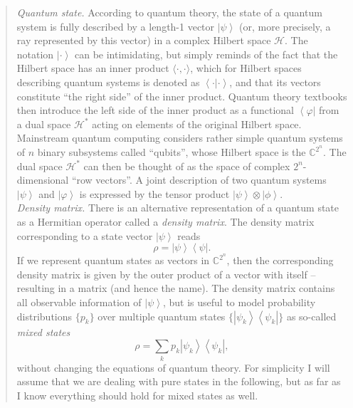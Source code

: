 \documentclass[aps, reprint, onecolumn, nofootinbib, longbibliography]{revtex4-2}
\newcommand{\ket}[1]{\ensuremath{\left| #1 \right \rangle}}
\newcommand{\bra}[1]{\ensuremath{\left \langle #1 \right |}}
\newcommand{\braket}[2]{\ensuremath{\left\langle #1\left|#2 \right.\right\rangle}}
\newcommand{\ketbra}[2]{\ket{#1}\!\bra{#2}}
\begin{document}
\begin{quote}
    \textit{Quantum state.} According to quantum theory, the state of a quantum system is fully described by a length-1 vector $\ket{\psi}$ (or, more precisely, a ray represented by this vector) in a complex Hilbert space $\mathcal{H}$. The notation $\ket{\cdot}$ can be intimidating, but simply reminds of the fact that the Hilbert space has an inner product $\langle \cdot , \cdot \rangle$, which for Hilbert spaces describing quantum systems is denoted as $\braket{\cdot}{\cdot}$, and that its vectors constitute ``the right side'' of the inner product. Quantum theory textbooks then introduce the left side of the inner product as a functional $\bra{\varphi}$ from a dual space $\mathcal{H}^*$ acting on elements of the original Hilbert space. Mainstream quantum computing considers rather simple quantum systems of $n$ binary subsystems called ``qubits'', whose Hilbert space is the $ \mathbb{C}^{2^n}$. The dual space $\mathcal{H}^*$ can then be thought of as the space of complex $2^n$-dimensional ``row vectors''. A joint description of two quantum systems $\ket{\psi}$ and $\ket{\varphi}$ is expressed by the tensor product $\ket{\psi} \otimes \ket{\phi}$.\\
    
    \textit{Density matrix.} There is an alternative representation of a quantum state as a Hermitian operator called a \textit{density matrix}. The density matrix corresponding to a state vector $\ket{\psi}$ reads
    \begin{equation}
        \rho = \ketbra{\psi}{\psi}.
    \end{equation} 
    If we represent quantum states as vectors in $\mathbb{C}^{2^n}$, then the corresponding density matrix is given by the outer product of a vector with itself -- resulting in a matrix (and hence the name). The density matrix contains all observable information of $\ket{\psi}$, but is useful to model probability distributions $\{p_k\}$ over multiple quantum states $\{\ketbra{\psi_k}{\psi_k}\}$ as so-called \textit{mixed states}
    \begin{equation}
        \rho = \sum_k p_k \ketbra{\psi_k}{\psi_k},
    \end{equation} 
    without changing the equations of quantum theory. For simplicity I will assume that we are dealing with pure states in the following, but as far as I know everything should hold for mixed states as well.\\


\end{quote}
\end{document}
